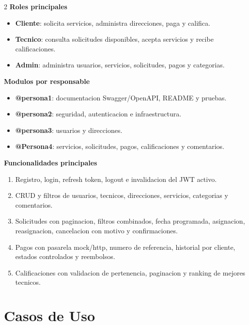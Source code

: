\documentclass[10pt]{article}
\begin{document}
\begin{multicols}{2}
\textbf{Roles principales}
\begin{itemize}
    \item \textbf{Cliente}: solicita servicios, administra direcciones, paga y califica.
    \item \textbf{Tecnico}: consulta solicitudes disponibles, acepta servicios y recibe calificaciones.
    \item \textbf{Admin}: administra usuarios, servicios, solicitudes, pagos y categorias.
\end{itemize}

\columnbreak
\textbf{Modulos por responsable}
\begin{itemize}
    \item \textbf{@persona1}: documentacion Swagger/OpenAPI, README y pruebas.
    \item \textbf{@persona2}: seguridad, autenticacion e infraestructura.
    \item \textbf{@persona3}: usuarios y direcciones.
    \item \textbf{@Persona4}: servicios, solicitudes, pagos, calificaciones y comentarios.
\end{itemize}
\end{multicols}

\textbf{Funcionalidades principales}
\begin{enumerate}
    \item Registro, login, refresh token, logout e invalidacion del JWT activo.
    \item CRUD y filtros de usuarios, tecnicos, direcciones, servicios, categorias y comentarios.
    \item Solicitudes con paginacion, filtros combinados, fecha programada, asignacion, reasignacion, cancelacion con motivo y confirmaciones.
    \item Pagos con pasarela mock/http, numero de referencia, historial por cliente, estados controlados y reembolsos.
    \item Calificaciones con validacion de pertenencia, paginacion y ranking de mejores tecnicos.
\end{enumerate}

\section{Casos de Uso}
\end{document}
